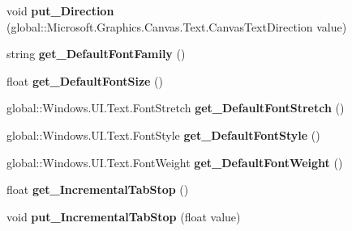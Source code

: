 \begin{DoxyCompactItemize}
void {\bfseries put\+\_\+\+Direction} (global\+::\+Microsoft.\+Graphics.\+Canvas.\+Text.\+Canvas\+Text\+Direction value)
\item 
\mbox{\label{class_microsoft_1_1_graphics_1_1_canvas_1_1_text_1_1_canvas_text_layout_a3b9b032aa706d4c64f518de16b2fb53d}} 
string {\bfseries get\+\_\+\+Default\+Font\+Family} ()
\item 
\mbox{\label{class_microsoft_1_1_graphics_1_1_canvas_1_1_text_1_1_canvas_text_layout_a7b61d023318daba6edb2a2a6e8d53fa4}} 
float {\bfseries get\+\_\+\+Default\+Font\+Size} ()
\item 
\mbox{\label{class_microsoft_1_1_graphics_1_1_canvas_1_1_text_1_1_canvas_text_layout_a39ba6144e9670d96a118f3b5b8933014}} 
global\+::\+Windows.\+U\+I.\+Text.\+Font\+Stretch {\bfseries get\+\_\+\+Default\+Font\+Stretch} ()
\item 
\mbox{\label{class_microsoft_1_1_graphics_1_1_canvas_1_1_text_1_1_canvas_text_layout_a027a22f4db9f7685afafe0bab3bf926b}} 
global\+::\+Windows.\+U\+I.\+Text.\+Font\+Style {\bfseries get\+\_\+\+Default\+Font\+Style} ()
\item 
\mbox{\label{class_microsoft_1_1_graphics_1_1_canvas_1_1_text_1_1_canvas_text_layout_a665d4ab9b759ce12af06a94fe2bbdcf2}} 
global\+::\+Windows.\+U\+I.\+Text.\+Font\+Weight {\bfseries get\+\_\+\+Default\+Font\+Weight} ()
\item 
\mbox{\label{class_microsoft_1_1_graphics_1_1_canvas_1_1_text_1_1_canvas_text_layout_ab2e404e95b6758f6f89df347404852eb}} 
float {\bfseries get\+\_\+\+Incremental\+Tab\+Stop} ()
\item 
\mbox{\label{class_microsoft_1_1_graphics_1_1_canvas_1_1_text_1_1_canvas_text_layout_a4c2519f1d2aacfc04974492ba6f07aa7}} 
void {\bfseries put\+\_\+\+Incremental\+Tab\+Stop} (float value)

\end{DoxyCompactItemize}
